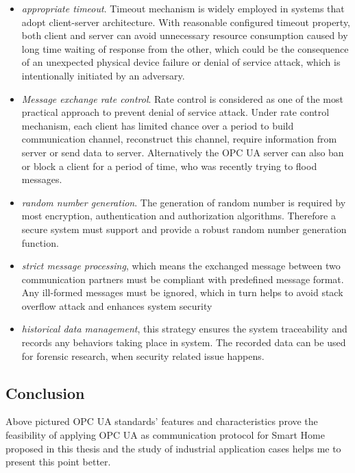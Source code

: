 \begin{itemize}
\item \emph{appropriate timeout}. Timeout mechanism is widely employed in systems that adopt client-server architecture. With reasonable configured timeout property, both client and server can avoid unnecessary resource consumption caused by long time waiting of response from the other, which could be the consequence of an unexpected physical device failure or denial of service attack, which is intentionally initiated by an adversary.
\item \emph{Message exchange rate control}. Rate control is considered as one of the most practical approach to prevent denial of service attack. Under rate control mechanism, each client has limited chance over a period to build communication channel, reconstruct this channel, require information from server or send data to server. Alternatively the OPC UA server can also ban or block a client for a period of time, who was recently trying to flood messages. 
\item \emph{random number generation}. The generation of random number is required by most encryption, authentication and authorization algorithms. Therefore a secure system must support and provide a robust random number generation function.
\item \emph{strict message processing}, which means the exchanged message between two communication partners must be compliant with predefined message format. Any ill-formed messages must be ignored, which in turn helps to avoid stack overflow attack and enhances system security
\item \emph{historical data management}, this strategy ensures the system traceability and records any behaviors taking place in system. The recorded data can be used for forensic research, when security related issue happens.
\end{itemize}
\subsection{Conclusion}
Above pictured OPC UA standards' features and characteristics prove the feasibility of applying OPC UA as communication protocol for Smart Home proposed in this thesis and the study of industrial application cases helps me to present this point better.


